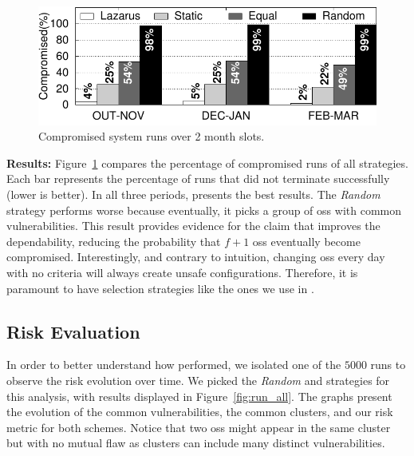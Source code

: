 \begin{figure}[h]
\begin{center}
\includegraphics[width=\columnwidth]{images/gnuplot/executions_new/execution.pdf}
\caption{Compromised system runs over 2 month slots.}
\label{fig:all_vulns}
\end{center}
\end{figure}

\textbf{Results:} Figure~\ref{fig:all_vulns} compares the percentage of compromised runs of all strategies. 
Each bar represents the percentage of runs that did not terminate successfully (lower is better). 
In all three periods, \system presents the best results. 
The \emph{Random} strategy performs worse because eventually, it picks a group of \glspl{os} with common vulnerabilities. 
This result provides evidence for the claim that \system improves the dependability, reducing the probability that $f+1$ \glspl{os} eventually become compromised. 
Interestingly, and contrary to intuition, changing \glspl{os} every day with no criteria will always create unsafe configurations.
Therefore, it is paramount to have selection strategies like the ones we use in \system.

\subsection{Risk Evaluation}


In order to better understand how \system performed, we isolated one of the $5000$ runs to observe the risk evolution over time. 
We picked the \emph{Random} and \system strategies for this analysis, with results displayed in Figure~\ref{fig:run_all}. 
The graphs present the evolution of the common vulnerabilities, the common clusters, and our risk metric for both schemes. 
Notice that two \glspl{os} might appear in the same cluster but with no mutual flaw as clusters can include many distinct vulnerabilities.

